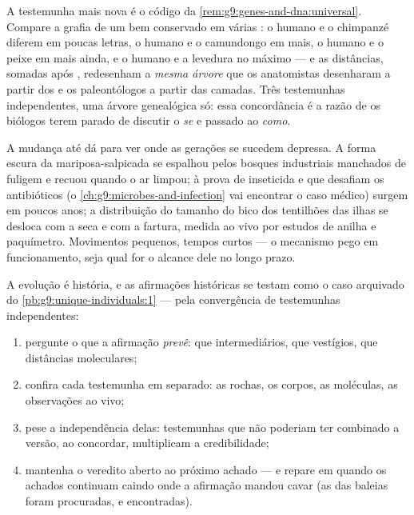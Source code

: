 \begin{proposition}\label{prop:g9:evidence-of-evolution:molecules}
A testemunha mais nova é o código da
\cref{rem:g9:genes-and-dna:universal}. Compare a grafia de um
 bem conservado em várias : o humano e o
chimpanzé diferem em poucas letras, o humano e o camundongo
em mais, o humano e o peixe em mais ainda, e o humano e a
levedura no máximo --- e as distâncias, somadas  após
, redesenham a \emph{mesma árvore} que os anatomistas
desenharam a partir dos  e os paleontólogos a partir das
camadas. Três testemunhas independentes, uma árvore
genealógica só: essa concordância é a razão de os biólogos
terem parado de discutir o \emph{se} e passado ao
\emph{como}.
\end{proposition}
\admitted

\begin{example}\label{ex:g9:evidence-of-evolution:live}
A mudança até dá para ver onde as gerações se sucedem
depressa. A forma escura da mariposa-salpicada se espalhou
pelos bosques industriais manchados de fuligem e recuou
quando o ar limpou;  à prova de inseticida e 
que desafiam os antibióticos (o
\cref{ch:g9:microbes-and-infection} vai encontrar o caso
médico) surgem em poucos anos; a distribuição do tamanho do
bico dos tentilhões das ilhas se desloca com a seca e com a
fartura, medida ao vivo por estudos de anilha e paquímetro.
Movimentos pequenos, tempos curtos --- o mecanismo pego em
funcionamento, seja qual for o alcance dele no longo prazo.
\end{example}

\begin{method}\label{met:g9:evidence-of-evolution:weigh}
A evolução é história, e as afirmações históricas se testam
como o caso arquivado do \cref{pb:g9:unique-individuals:1}
--- pela convergência de testemunhas independentes:
\begin{enumerate}
  \item pergunte o que a afirmação \emph{prevê}: que
        intermediários, que vestígios, que distâncias
        moleculares;
  \item confira cada testemunha em separado: as rochas, os
        corpos, as moléculas, as observações ao vivo;
  \item pese a independência delas: testemunhas que não
        poderiam ter combinado a versão, ao concordar,
        multiplicam a credibilidade;
  \item mantenha o veredito aberto ao próximo achado --- e
        repare em quando os achados continuam caindo onde a
        afirmação mandou cavar (as  das baleias foram
        procuradas, e encontradas).
\end{enumerate}
\end{method}

